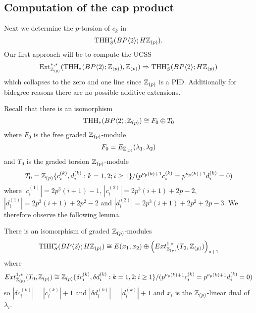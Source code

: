 \subsection{Computation of the cap product}
Next we determine the $p$-torsion of $c_k$ in 
\[\operatorname{THH}_S^*(BP\langle 2 \rangle;H\mathbb{Z}_{(p)}).\] 
Our first approach will be to compute the UCSS 
\[ \operatorname{Ext}_{\mathbb{Z}_{(p)}}^{*,*}(\operatorname{THH}_*(BP\langle 2 \rangle;\mathbb{Z}_{(p)}),\mathbb{Z}_{(p)})\Rightarrow \operatorname{THH}_S^*(BP\langle 2 \rangle;H\mathbb{Z}_{(p)})\]
which collapses to the zero and one line since $\mathbb{Z}_{(p)}$ is a PID. Additionally for bidegree reasons there are no possible additive extensions.

Recall that there is an isomorphism 
\[\operatorname{THH}_*(BP\langle 2 \rangle;\mathbb{Z}_{(p)})\cong F_0\oplus T_0 \]
where $F_0$ is the free graded $\mathbb{Z}_{(p)}$-module 
\[ F_0=E_{\mathbb{Z}_{(p)}}(\lambda_1,\lambda_2)\]
and $T_0$ is the graded torsion $\mathbb{Z}_{(p)}$-module 
\[T_0=\mathbb{Z}_{(p)}\{c_i^{(k)},d_i^{(k)} : k=1,2 ; i\ge 1\}/(p^{\nu_p(k)+1}c_i^{(k)}=p^{\nu_p(k)+1}d_i^{(k)}=0)\]
where $|c_i^{(1)}|=2p^3(i+1)-1$, $|c_i^{(2)}|=2p^3(i+1)+2p-2$, $|d_i^{(1)}|=2p^3(i+1)+2p^2-2$ and $|d_i^{(2)}|=2p^3(i+1)+2p^2+2p-3$. 
We therefore observe the following lemma. 
\begin{lem}\label{torsion in THC(BP1Z)}
There is an isomorphism of graded $\mathbb{Z}_{(p)}$-modules 
\[ \operatorname{THH}_S^*(BP\langle 2 \rangle;H\mathbb{Z}_{(p)}) \cong E(x_1,x_2)\oplus \left (Ext^{1,*}_{\mathbb{Z}_{(p)}}(T_0,\mathbb{Z}_{(p)}) \right)_{*+1}\]
where 
\[Ext^{1,*}_{\mathbb{Z}_{(p)}}(T_0,\mathbb{Z}_{(p)})\cong  \mathbb{Z}_{(p)}\{\delta c_i^{(k)},\delta d_i^{(k)} : k=1,2 ; i\ge 1\}/(p^{\nu_p(k)+1}c_i^{(k)}=p^{\nu_p(k)+1}d_i^{(k)}=0) \]
so $|\delta c_i^{(k)}|=|c_i^{(k)}|+1$ and $|\delta d_i^{(k)}|=|d_i^{(k)}|+1$ and $x_i$ is the $\mathbb{Z}_{(p)}$-linear dual of $\lambda_i$.
\end{lem}

